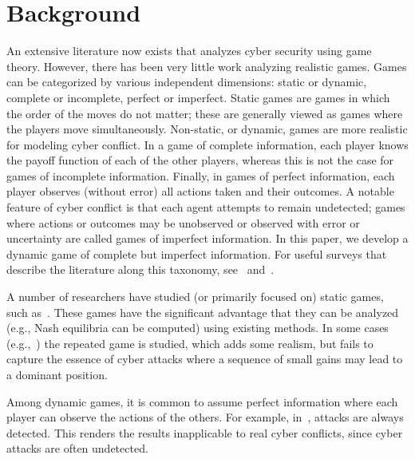 \documentclass{sig-alternate}
\begin{document}
\section{Background}
\label{sec:background}
An extensive literature now exists that analyzes cyber security using
game theory. However, there has been very little work analyzing realistic
games. Games can be categorized by various independent dimensions:
static or dynamic, complete or incomplete, perfect
or imperfect. Static games are games in which the order of the moves
do not matter; these are generally viewed as games where the players
move simultaneously. Non-static, or dynamic, games are more realistic
for modeling cyber conflict. In a game of complete information, each
player knows the payoff function of each of the other players, whereas
this is not the case for games of incomplete information. Finally, in
games of perfect information, each player observes (without error) all
actions taken and their outcomes. A notable feature of cyber conflict
is that each agent attempts to remain undetected; games where actions
or outcomes may be unobserved or observed with error or uncertainty
are called games of imperfect information. In this paper, we develop a
dynamic game of complete but imperfect information. For useful surveys
that describe the literature along this taxonomy,
see~\cite{liang2013game} and~\cite{roy2010survey}.


A number of researchers have studied (or primarily focused on) static
games, such as~\cite{chen2009game,grossklags2009uncertainty,he2012game,liu2006bayesian}. These
games have the significant advantage that they can be analyzed (e.g.,
Nash equilibria can be computed) using existing methods. In some cases
(e.g.,~\cite{nguyen2009security}) the repeated game is studied, which
adds some realism, but fails to capture the essence of cyber attacks
where a sequence of small gains may lead to a dominant position.


Among dynamic games, it is common to assume perfect information where
each player can observe the actions of the others. For example,
in~\cite{luo2010game, nguyen2009security, patcha2004game, 
  sagduyu2011jamming, shamma2005dynamic}, attacks are always
detected. This renders the results inapplicable to real cyber
conflicts, since cyber attacks are often undetected.
\end{document}
